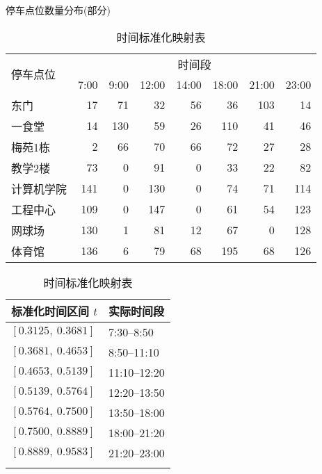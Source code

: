 \documentclass[withoutpreface,bwprint]{cumcmthesis}
\begin{document}
\begin{table}[htbp]
\centering
\begin{minipage}[t]{0.6\textwidth}  %
\centering
\caption{停车点位数量分布(部分)}
\label{tab:停车点位数量分布(部分)}
\small
\begin{tabular}{@{}lrrrrrrr@{}}
\toprule
\multirow{2}{*}{停车点位} & \multicolumn{7}{c}{时间段} \\ 
\cmidrule(lr){2-8}
 & 7:00 & 9:00 & 12:00 & 14:00 & 18:00 & 21:00 & 23:00 \\
\midrule
东门       & 17  & 71  & 32  & 56  & 36  & 103 & 14  \\
一食堂     & 14  & 130 & 59  & 26  & 110 & 41  & 46  \\
梅苑1栋    & 2   & 66  & 70  & 66  & 72  & 27  & 28  \\
教学2楼    & 73  & 0   & 91  & 0   & 33  & 22  & 82  \\
计算机学院 & 141 & 0   & 130 & 0   & 74  & 71  & 114 \\
工程中心   & 109 & 0   & 147 & 0   & 61  & 54  & 123 \\
网球场     & 130 & 1   & 81  & 12  & 67  & 0   & 128 \\
体育馆     & 136 & 6   & 79  & 68  & 195 & 68  & 126 \\
\bottomrule
\end{tabular}
\end{minipage}
\hfill
\begin{minipage}[t]{0.35\textwidth}  %
\centering
\caption{时间标准化映射表}
\label{tab:时间标准化映射表}
\small
\begin{tabular}{@{}ll@{}}
\toprule
标准化时间区间 $t$ & 实际时间段 \\
\midrule
$[0.3125,\ 0.3681]$ & 7:30--8:50 \\\addlinespace[1.6ex]
$[0.3681,\ 0.4653]$ & 8:50--11:10 \\\addlinespace[1.6ex]
$[0.4653,\ 0.5139]$ & 11:10--12:20 \\\addlinespace[1.6ex]
$[0.5139,\ 0.5764]$ & 12:20--13:50 \\\addlinespace[1.6ex]
$[0.5764,\ 0.7500]$ & 13:50--18:00 \\\addlinespace[1.6ex]
$[0.7500,\ 0.8889]$ & 18:00--21:20 \\\addlinespace[1.6ex]
$[0.8889,\ 0.9583]$ & 21:20--23:00 \\\addlinespace[1.6ex]
\bottomrule
\end{tabular}
\end{minipage}

\vspace{0.5em}
\end{table}
\end{document}

